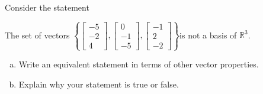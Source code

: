 
\begin{exerciseStatement}


Consider the statement 
\begin{center}\begin{minipage}{0.8\textwidth}
 The set of vectors \( \left\{ \left[\begin{array}{c}
-5 \\
-2 \\
4
\end{array}\right] , \left[\begin{array}{c}
0 \\
-1 \\
-5
\end{array}\right] , \left[\begin{array}{c}
-1 \\
2 \\
-2
\end{array}\right] \right\} \)is not a basis of \(\mathbb{R}^3\). 
\end{minipage}\end{center}
    


\begin{enumerate}[(a)]
\item  Write an equivalent statement in terms of other vector properties.
\item  Explain why your statement is true or false.
\end{enumerate}
    
\end{exerciseStatement}
    
